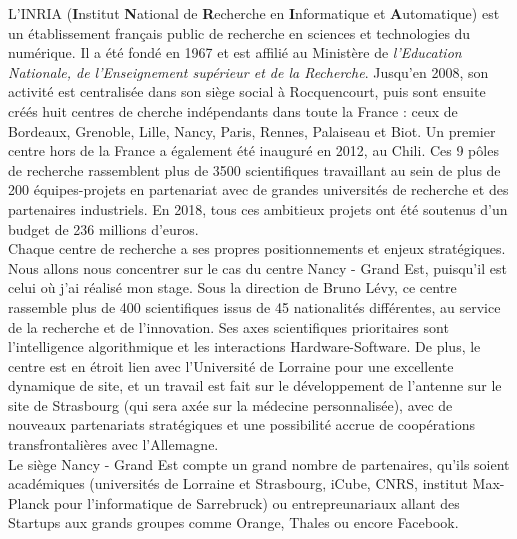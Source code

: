 \documentclass[stage2a]{tnreport} %
\begin{document}
L'INRIA (\textbf{I}nstitut \textbf{N}ational de \textbf{R}echerche en \textbf{I}nformatique et \textbf{A}utomatique) est un établissement français public de recherche en sciences et technologies du numérique.  Il a été fondé en 1967 et est affilié au Ministère de \emph{l'Education Nationale, de l'Enseignement supérieur et de la Recherche}. Jusqu'en 2008, son activité est centralisée dans son siège social à Rocquencourt, puis sont ensuite créés huit centres de cherche indépendants dans toute la France : ceux de Bordeaux, Grenoble, Lille, Nancy, Paris, Rennes, Palaiseau et Biot. Un premier centre hors de la France a également été inauguré en 2012, au Chili. Ces 9 pôles de recherche rassemblent plus de 3500 scientifiques travaillant au sein de plus de 200 équipes-projets en partenariat avec de grandes universités de recherche et des partenaires industriels. En 2018, tous ces ambitieux projets ont été soutenus d'un budget de 236 millions d'euros. \\

Chaque centre de recherche a ses propres positionnements et enjeux stratégiques. Nous allons nous concentrer sur le cas du centre Nancy - Grand Est, puisqu'il est celui où j'ai réalisé mon stage. Sous la direction de Bruno Lévy, ce centre rassemble plus de 400 scientifiques issus de 45 nationalités différentes, au service de la recherche et de l'innovation. Ses axes scientifiques prioritaires sont l'intelligence algorithmique et les interactions Hardware-Software. De plus, le centre est en étroit lien avec l'Université de Lorraine pour une excellente dynamique de site, et un travail est fait sur le développement de l'antenne sur le site de Strasbourg (qui sera axée sur la médecine personnalisée), avec de nouveaux partenariats stratégiques et une possibilité accrue de coopérations transfrontalières avec l'Allemagne. \\
Le siège Nancy - Grand Est compte un grand nombre de partenaires, qu'ils soient académiques (universités de Lorraine et Strasbourg, iCube, CNRS, institut Max-Planck pour l'informatique de Sarrebruck) ou entrepreunariaux allant des Startups aux grands groupes comme Orange, Thales ou encore Facebook. \\
\end{document}
